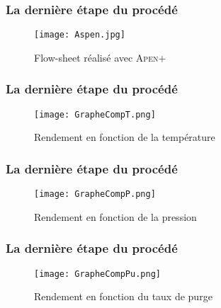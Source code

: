 \documentclass{beamer}
\begin{document}
\begin{frame}
\frametitle{La dernière étape du procédé}

\begin{figure}[ht!]
\centering
\texttt{[image: Aspen.jpg]}
\caption{Flow-sheet réalisé avec \textsc{Apen+}}
\label{Aspen}
\end{figure}

\end{frame}



\begin{frame}
\frametitle{La dernière étape du procédé}

\begin{figure}[ht!]
\centering
\texttt{[image: GrapheCompT.png]}
\caption{Rendement en fonction de la température}
\label{scheme1}
\end{figure}

\end{frame}


\begin{frame}
\frametitle{La dernière étape du procédé}

\begin{figure}[ht!]
\centering
\texttt{[image: GrapheCompP.png]}
\caption{Rendement en fonction de la pression}
\label{scheme2}
\end{figure}

\end{frame}



\begin{frame}
\frametitle{La dernière étape du procédé}

\begin{figure}[ht!]
\centering
\texttt{[image: GrapheCompPu.png]}
\caption{Rendement en fonction du taux de purge}
\label{schemee}
\end{figure}

\end{frame}
\end{document}
